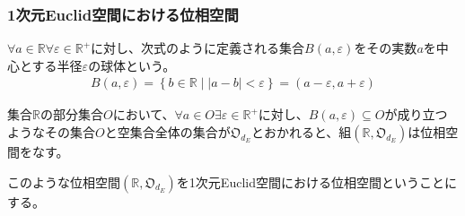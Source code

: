 \documentclass[dvipdfmx]{jsarticle}
\begin{document}
\subsubsection{1次元Euclid空間における位相空間}%
\begin{dfn}\label{1次元Euclid空間における球体}
$\forall a \in \mathbb{R}\forall\varepsilon \in \mathbb{R}^{+}$に対し、次式のように定義される集合$B(a,\varepsilon)$をその実数$a$を中心とする半径$\varepsilon$の球体という。
\begin{align*}
B(a,\varepsilon) = \left\{ b \in \mathbb{R} \middle| |a - b| < \varepsilon \right\} = (a - \varepsilon,a + \varepsilon)
\end{align*}
\end{dfn}
\begin{thm}\label{8.1.7.18}
集合$\mathbb{R}$の部分集合$O$において、$\forall a \in O\exists\varepsilon \in \mathbb{R}^{+}$に対し、$B(a,\varepsilon) \subseteq O$が成り立つようなその集合$O$と空集合全体の集合が$\mathfrak{O}_{d_{E}}$とおかれると、組$\left( \mathbb{R},\mathfrak{O}_{d_{E}} \right)$は位相空間をなす。
\end{thm}
\begin{dfn}\label{1次元Euclid空間における位相空間}
このような位相空間$\left( \mathbb{R},\mathfrak{O}_{d_{E}} \right)$を1次元Euclid空間における位相空間ということにする。
\end{dfn}
\end{document}
